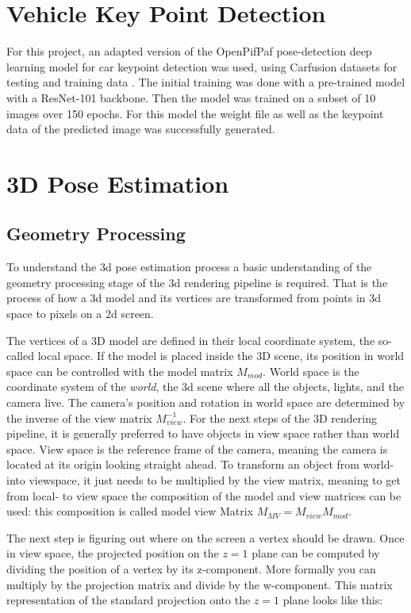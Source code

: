 \documentclass[conference]{IEEEtran}
\begin{document}
\section{Vehicle Key Point Detection}

For this project, an adapted version of the OpenPifPaf pose-detection deep learning model for car keypoint detection was used, using Carfusion datasets for testing and training data \cite{CFusion}. The initial training was done with a pre-trained model with a ResNet-101 backbone. Then the model was trained on a subset of 10 images over 150 epochs. For this model the weight file as well as the keypoint data of the predicted image was successfully generated. 

\section{3D Pose Estimation}

\subsection{Geometry Processing}

To understand the 3d pose estimation process a basic understanding of the geometry processing stage of the 3d rendering pipeline is required. That is the process of how a 3d model and its vertices are transformed from points in 3d space to pixels on a 2d screen.

The vertices of a 3D model are defined in their local coordinate system, the so-called local space. If the model is placed inside the 3D scene, its position in world space can be controlled with the model matrix $M_{mod}$. World space is the coordinate system of the \textit{world}, the 3d scene where all the objects, lights, and the camera live. The camera's position and rotation in world space are determined by the inverse of the view matrix $M_{view}^{-1}$. For the next steps of the 3D rendering pipeline, it is generally preferred to have objects in view space rather than world space. View space is the reference frame of the camera, meaning the camera is located at its origin looking straight ahead. To transform an object from world- into viewspace, it just needs to be multiplied by the view matrix, meaning to get from local- to view space the composition of the model and view matrices can be used: this composition is called model view Matrix $M_{MV}=M_{view}M_{mod}$.

The next step is figuring out where on the screen a vertex should be drawn. Once in view space, the projected position on the $z = 1$ plane can be computed by dividing the position of a vertex by its z-component. More formally you can multiply by the projection matrix and divide by the w-component. This matrix representation of the standard projection onto the $z = 1$ plane looks like this:
\end{document}

